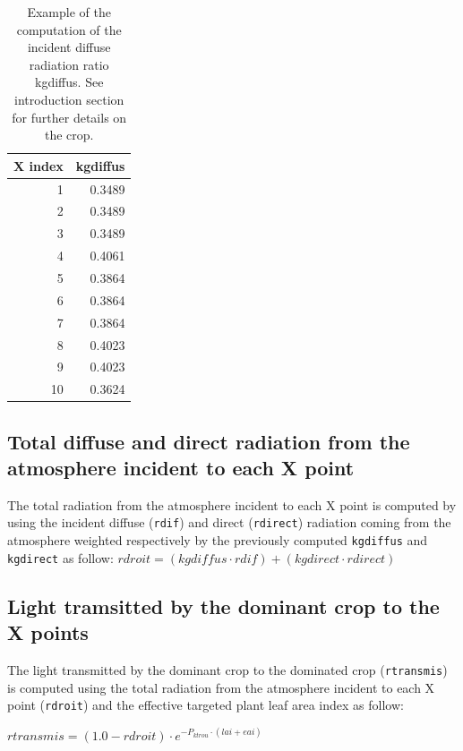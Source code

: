 \documentclass[]{book}
\theoremstyle{definition}
\theoremstyle{definition}
\theoremstyle{definition}
\theoremstyle{remark}
\begin{document}
\begin{table}

\caption{\label{tab:kdifftot}Example of the computation of the incident diffuse radiation ratio kgdiffus. See introduction section for further details on the crop.}
\centering
\begin{tabular}[t]{r|r}
\hline
X index & kgdiffus\\
\hline
1 & 0.3489\\
\hline
2 & 0.3489\\
\hline
3 & 0.3489\\
\hline
4 & 0.4061\\
\hline
5 & 0.3864\\
\hline
6 & 0.3864\\
\hline
7 & 0.3864\\
\hline
8 & 0.4023\\
\hline
9 & 0.4023\\
\hline
10 & 0.3624\\
\hline
\end{tabular}
\end{table}

\subsection{Total diffuse and direct radiation from the atmosphere
incident to each X
point}\label{total-diffuse-and-direct-radiation-from-the-atmosphere-incident-to-each-x-point}

The total radiation from the atmosphere incident to each X point is
computed by using the incident diffuse (\texttt{rdif}) and direct
(\texttt{rdirect}) radiation coming from the atmosphere weighted
respectively by the previously computed \texttt{kgdiffus} and
\texttt{kgdirect} as follow:
\(rdroit=(kgdiffus\cdot rdif)+(kgdirect\cdot rdirect)\)

\subsection{Light tramsitted by the dominant crop to the X
points}\label{light-tramsitted-by-the-dominant-crop-to-the-x-points}

The light transmitted by the dominant crop to the dominated crop
(\texttt{rtransmis}) is computed using the total radiation from the
atmosphere incident to each X point (\texttt{rdroit}) and the effective
targeted plant leaf area index as follow:

\(rtransmis=(1.0-rdroit)\cdot e^{-P_{ktrou}\cdot(lai+eai)}\)
\end{document}
